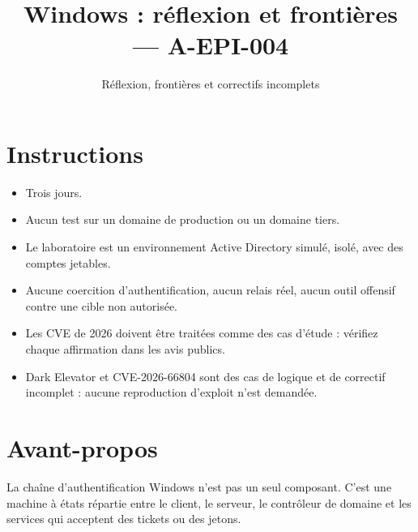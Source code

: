 \documentclass{training}
\begin{document}
\title{Windows : réflexion et frontières --- A-EPI-004}
\subtitle{Réflexion, frontières et correctifs incomplets}
\maketitle

\newpage
\tableofcontents
\newpage

\chapter{Instructions}
\begin{itemize}
  \item Trois jours.
  \item Aucun test sur un domaine de production ou un domaine tiers.
  \item Le laboratoire est un environnement Active Directory simulé,
        isolé, avec des comptes jetables.
  \item Aucune coercition d'authentification, aucun relais réel, aucun
        outil offensif contre une cible non autorisée.
  \item Les CVE de 2026 doivent être traitées comme des cas d'étude :
        vérifiez chaque affirmation dans les avis publics.
  \item Dark Elevator et CVE-2026-66804 sont des cas de logique et de
        correctif incomplet : aucune reproduction d'exploit n'est demandée.
\end{itemize}





\chapter{Avant-propos}

La chaîne d'authentification Windows n'est pas un seul composant. C'est une
machine à états répartie entre le client, le serveur, le contrôleur de
domaine et les services qui acceptent des tickets ou des jetons.
\end{document}
